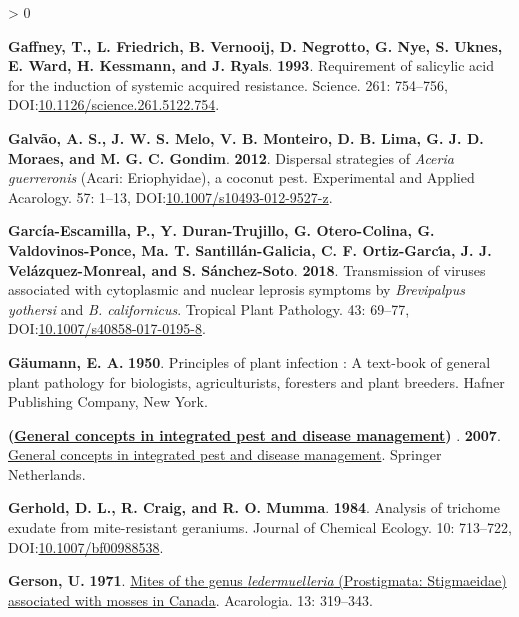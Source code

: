 \documentclass{ufdissertation}[overrideChapters] %
\newlength{\cslhangindent}
\newenvironment{CSLReferences}[2] %
 {%
  \setlength{\parindent}{0pt}
  \ifodd #1 \everypar{\setlength{\hangindent}{\cslhangindent}}\ignorespaces\fi
  \ifnum #2 > 0
  \setlength{\parskip}{#2\baselineskip}
  \fi
 }%
 {}
\begin{document}
{\begin{CSLReferences}{1}{1}
\leavevmode{}%
\textbf{Gaffney, T., L. Friedrich, B. Vernooij, D. Negrotto, G. Nye, S. Uknes, E. Ward, H. Kessmann, and J. Ryals}. \textbf{1993}. Requirement of salicylic acid for the induction of systemic acquired resistance. Science. 261: 754--756, DOI:\href{https://doi.org/10.1126/science.261.5122.754}{10.1126/science.261.5122.754}.

\leavevmode{}%
\textbf{Galvão, A. S., J. W. S. Melo, V. B. Monteiro, D. B. Lima, G. J. D. Moraes, and M. G. C. Gondim}. \textbf{2012}. Dispersal strategies of {\emph{Aceria guerreronis}} ({Acari}: {Eriophyidae}), a coconut pest. Experimental and Applied Acarology. 57: 1--13, DOI:\href{https://doi.org/10.1007/s10493-012-9527-z}{10.1007/s10493-012-9527-z}.

\leavevmode{}%
\textbf{García-Escamilla, P., Y. Duran-Trujillo, G. Otero-Colina, G. Valdovinos-Ponce, Ma. T. Santillán-Galicia, C. F. Ortiz-Garcı́a, J. J. Velázquez-Monreal, and S. Sánchez-Soto}. \textbf{2018}. Transmission of viruses associated with cytoplasmic and nuclear leprosis symptoms by {\emph{Brevipalpus yothersi}} and {\emph{B. californicus}}. Tropical Plant Pathology. 43: 69--77, DOI:\href{https://doi.org/10.1007/s40858-017-0195-8}{10.1007/s40858-017-0195-8}.

\leavevmode{}%
\textbf{Gäumann, E. A.} \textbf{1950}. Principles of plant infection : A text-book of general plant pathology for biologists, agriculturists, foresters and plant breeders. Hafner Publishing Company, New York.

\leavevmode{}%
\textbf{(\href{https://www.ebook.de/de/product/6740472/general_concepts_in_integrated_pest_and_disease_management.html}{General concepts in integrated pest and disease management}) }. \textbf{2007}. \href{https://www.ebook.de/de/product/6740472/general_concepts_in_integrated_pest_and_disease_management.html}{General concepts in integrated pest and disease management}. Springer Netherlands.

\leavevmode{}%
\textbf{Gerhold, D. L., R. Craig, and R. O. Mumma}. \textbf{1984}. Analysis of trichome exudate from mite-resistant geraniums. Journal of Chemical Ecology. 10: 713--722, DOI:\href{https://doi.org/10.1007/bf00988538}{10.1007/bf00988538}.

\leavevmode{}%
\textbf{Gerson, U.} \textbf{1971}. \href{http://www1.montpellier.inra.fr/CBGP/acarologia/article.php?id=3368}{Mites of the genus \emph{ledermuelleria} ({Prostigmata}: {Stigmaeidae}) associated with mosses in {Canada}}. Acarologia. 13: 319--343.


\end{CSLReferences}}
\end{document}
